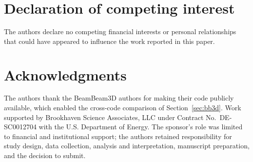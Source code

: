 \documentclass[a4paper,fleqn]{cas-sc}
\begin{document}
\section*{Declaration of competing interest}

The authors declare no competing financial interests or personal
relationships that could have appeared to influence the work reported in
this paper.

\printcredits

\section*{Acknowledgments}

The authors thank the BeamBeam3D authors for making their code publicly
available, which enabled the cross-code comparison of
Section~\ref{sec:bb3d}.  Work supported by Brookhaven Science Associates,
LLC under Contract No.\ DE-SC0012704 with the U.S. Department of Energy.
The sponsor's role was limited to financial and institutional support; the
authors retained responsibility for study design, data collection, analysis
and interpretation, manuscript preparation, and the decision to submit.



\end{document}

